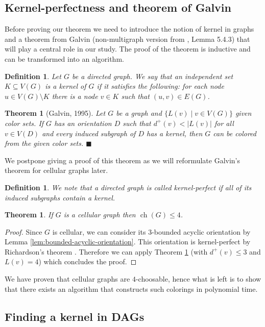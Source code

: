 \documentclass[a4paper, 12pt]{article}
\newtheorem{theo}[lem]{Theorem}
\newtheorem{defin}[lem]{Definition}
\DeclareMathOperator*{\ch}{ch}
\begin{document}
\subsection{Kernel-perfectness and theorem of Galvin}\label{sec:kernel-perf-and-galvin}
Before proving our theorem we need to introduce the notion of kernel in graphs and a theorem from Galvin \cite{Galvin:1995:LCI:199352.199369} (non-multigraph version from \cite{citeulike:395714}, Lemma 5.4.3) that will play a central role in our study. The proof of the theorem is inductive and can be transformed into an algorithm.
\begin{defin} Let $G$ be a directed graph. We say that an independent set $K \subseteq V(G)$ is a kernel of $G$ if it satisfies the following: for each node $u \in V(G) \setminus K$ there is a node $v \in K$ such that $(u,v) \in E(G)$.
\end{defin}
\begin{theo}[Galvin, 1995]\label{thm:galvin} Let $G$ be a graph and $\lbrace L(v) \mid v \in V(G) \rbrace$ given color sets. If $G$ has an orientation $D$ such that $d^+(v) < |L(v)|$ for all $v \in V(D)$ and every induced subgraph of $D$ has a kernel, then $G$ can be colored from the given color sets. $\blacksquare$
\end{theo}
We postpone giving a proof of this theorem as we will reformulate Galvin's theorem for cellular graphs later.
\begin{defin} We note that a directed graph is called kernel-perfect if all of its induced subgraphs contain a kernel.
\end{defin}
\begin{theo}\label{thm:choice-number}
If $G$ is a cellular graph then $\ch(G) \leqslant 4$.
\end{theo}
\begin{proof}
Since $G$ is cellular, we can consider its $3$-bounded acyclic orientation by Lemma \ref{lem:bounded-acyclic-orientation}. This orientation is kernel-perfect by Richardson's theorem \cite{richardson1946}. Therefore we can apply Theorem \ref{thm:galvin} (with $d^+(v) \leqslant 3$ and $L(v)=4$) which concludes the proof.
\end{proof}

We have proven that cellular graphs are $4$-choosable, hence what is left is to show that there exists an algorithm that constructs such colorings in polynomial time.
\subsection{Finding a kernel in DAGs}\label{sec:dag}
\end{document}
